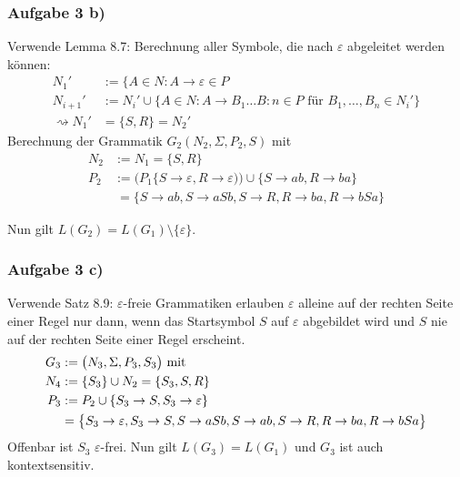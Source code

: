 \subsubsection{Aufgabe 3 b)}

\begin{lösung}
	Verwende Lemma 8.7:
	Berechnung aller Symbole, die nach $\varepsilon$ abgeleitet werden können:
	\begin{align*}
		N_1'&:=\big\lbrace A\in N:A\to\varepsilon\in P\\
		N_{i+1}'&:=N_i'\cup\big\lbrace A\in N:A\to B_1\ldots B:n\in P\text{ für }B_1,\ldots,B_n\in N_i'\big\rbrace\\
		\rightsquigarrow N_1'&=\lbrace S,R\rbrace=N_2'
	\end{align*}
	Berechnung der Grammatik $G_2(N_2,\Sigma,P_2,S)$ mit 
	\begin{align*}
		N_2&:=N_1=\lbrace S,R\rbrace\\
		P_2&:=\big(P_1\lbrace S\to\varepsilon,R\to\varepsilon)\big)\cup\lbrace S\to ab, R\to ba\rbrace\\
		&~=\big\lbrace
			S\to ab, S\to aSb,S\to R,R\to ba,R\to bSa
		\big\rbrace
	\end{align*}
	
	Nun gilt $L(G_2)=L(G_1)\setminus\lbrace\varepsilon\rbrace$.
\end{lösung}

\subsubsection{Aufgabe 3 c)}

\begin{lösung}
	Verwende Satz 8.9:
	$\varepsilon$-freie Grammatiken erlauben $\varepsilon$ alleine auf der rechten Seite einer Regel nur dann, wenn das Startsymbol $S$ auf $\varepsilon$ abgebildet wird und $S$ nie auf der rechten Seite einer Regel erscheint.
	\begin{align*}
		G_3&:=\big(N_3,\Sigma,P_3,S_3\big)\mit\\
		N_4&:=\lbrace S_3\rbrace\cup N_2=\lbrace S_3,S,R\rbrace\\
		P_3&:=P_2\cup\lbrace S_3\to S,S_3\to\varepsilon\rbrace\\
		&=\big\lbrace
			S_3\to\varepsilon, S_3\to S, S\to aSb, S\to ab, S\to R,R\to ba,R\to bSa
		\big\rbrace
	\end{align*}
	Offenbar ist $S_3$ $\varepsilon$-frei.
	Nun gilt $L(G_3)=L(G_1)$ und $G_3$ ist auch kontextsensitiv.
\end{lösung}

